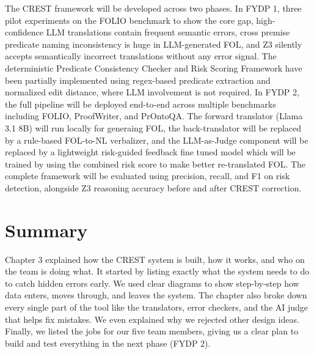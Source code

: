 The CREST framework will be developed across two phases. In FYDP 1, three pilot experiments on the FOLIO benchmark to show the core gap, high-confidence LLM translations contain frequent semantic errors, cross premise predicate naming inconsistency is huge in LLM-generated FOL, and Z3 silently accepts semantically incorrect translations without any error signal. The deterministic Predicate Consistency Checker and Risk Scoring Framework have been partially implemented using regex-based predicate extraction and normalized edit distance, where LLM involvement is not required. In FYDP 2, the full pipeline will be deployed end-to-end across multiple benchmarks including FOLIO, ProofWriter, and PrOntoQA. The forward translator (Llama 3.1 8B) will run locally for generaing FOL, the back-translator will be replaced by a rule-based FOL-to-NL verbalizer, and the LLM-as-Judge component will be replaced by a lightweight risk-guided feedback fine tuned model which will be  trained by  using the combined risk score to make better re-translated FOL. The complete framework will be evaluated using precision, recall, and F1 on risk detection, alongside Z3 reasoning accuracy before and after CREST correction.

\section{Summary}

Chapter 3 explained how the CREST system is built, how it works, and who on the team is doing what. It started by listing exactly what the system needs to do to catch hidden errors early. We used clear diagrams to show step-by-step how data enters, moves through, and leaves the system. The chapter also broke down every single part of the tool like the translators, error checkers, and the AI judge that helps fix mistakes. We even explained why we rejected other design ideas. Finally, we listed the jobs for our five team members, giving us a clear plan to build and test everything in the next phase (FYDP 2).